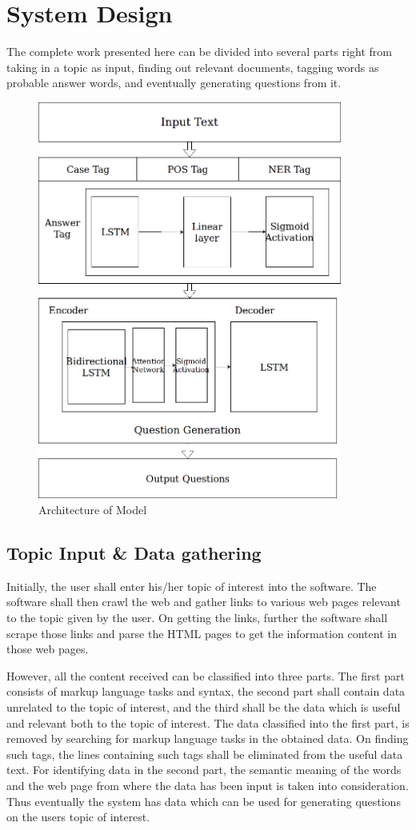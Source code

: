 \chapter{System Design}

The complete work presented here can be divided into several parts right from
taking in a topic as input, finding out relevant documents, tagging words as
probable answer words, and eventually generating questions from it. 

\begin{figure}
	\caption{Architecture of Model}
	\centering\includegraphics[width=10cm]{5.png}
\end{figure}

\section{Topic Input \& Data gathering}

Initially, the user shall enter his/her topic of interest into the software. The
software shall then crawl the web and gather links to various web pages relevant
to the topic given by the user. On getting the links, further the software shall
scrape those links and parse the HTML pages to get the information content in
those web pages.  

However, all the content received can be classified into three parts. The first
part consists of markup language tasks and syntax, the second part shall contain
data unrelated to the topic of interest, and the third shall be the data which
is useful and relevant both to the topic of interest. The data classified into
the first part, is removed by searching for markup language tasks in the
obtained data.  On finding such tags, the lines containing such tags shall be
eliminated from the useful data text. For identifying data in the second part,
the semantic meaning of the words and the web page from where the data has been
input is taken into consideration. Thus eventually the system has data which can
be used for generating questions on the users topic of interest.


